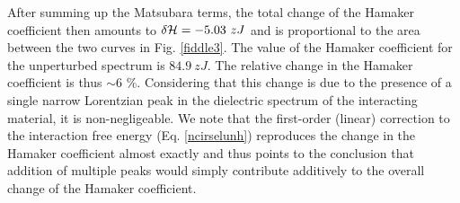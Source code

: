 \documentclass[letterpaper,twocolumn,amsmath,amssymb,floatfix,aps,superscriptaddress]{revtex4}
\begin{document}
After summing up the Matsubara terms, the total change of the Hamaker coefficient then amounts to $\delta {\cal H} = -5.03~ zJ$ and is proportional to the area between the two curves in Fig.  \ref{fiddle3}. The value of the Hamaker coefficient for the unperturbed spectrum is $84.9~ zJ$. The relative change in the Hamaker coefficient is thus $\sim 6$ \%. Considering that this change is due to the presence of a single narrow Lorentzian peak in the dielectric spectrum of the interacting material, it is non-negligeable. We note that the first-order (linear) correction to the interaction free energy (Eq. \ref{ncirselunh}) reproduces the change in the Hamaker coefficient almost exactly and thus points to the conclusion that addition of multiple peaks would simply contribute additively to the overall change of the Hamaker coefficient.
\end{document}
